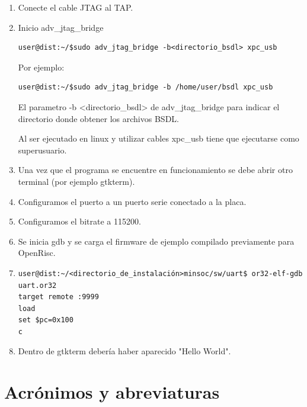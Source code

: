 \begin{enumerate}

\item Conecte el cable JTAG al TAP.
\item Inicio adv\_jtag\_bridge

\begin{lstlisting}[breaklines]
user@dist:~/$sudo adv_jtag_bridge -b<directorio_bsdl> xpc_usb 
\end{lstlisting}

Por ejemplo:

\begin{lstlisting}[breaklines]
user@dist:~/$sudo adv_jtag_bridge -b /home/user/bsdl xpc_usb 
\end{lstlisting}

El parametro -b <directorio\_bsdl> de adv\_jtag\_bridge para indicar el directorio donde obtener los archivos BSDL.

Al ser ejecutado en linux y utilizar cables xpc\_usb tiene que ejecutarse como superusuario.


\item Una vez que el programa se encuentre en funcionamiento se debe abrir otro terminal (por ejemplo gtkterm).
\item Configuramos el puerto a un puerto serie conectado a la placa.
\item Configuramos el bitrate a 115200.

\item Se inicia gdb y se carga el firmware de ejemplo compilado previamente para OpenRisc.

\item 
\begin{lstlisting}[breaklines]
user@dist:~/<directorio_de_instalación>minsoc/sw/uart$ or32-elf-gdb uart.or32
target remote :9999
load
set $pc=0x100
c
\end{lstlisting}

\item Dentro de gtkterm debería haber aparecido "Hello World". 

\end{enumerate}


\newpage

\section{Acrónimos y abreviaturas}


